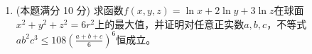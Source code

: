 \begin{enumerate}
{	
}


\item 
(本题满分 10 分)
求函数$ f(x, y, z)=\ln x+2 \ln y+3 \ln z $在球面$ x^{2}+y^{2}+z^{2}=6 r^{2} $上的最大值，并证明对任意正实数$ a,b,c $，不等式$ a b^{2} c^{3} \leq 108\left(\frac{a+b+c}{6}\right)^6 $恒成立。

	
	
	
\end{enumerate}

